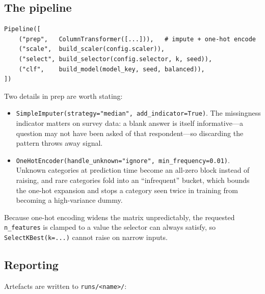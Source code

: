 \documentclass[11pt,a4paper]{article}
\begin{document}
\subsection{The pipeline}

\begin{lstlisting}
Pipeline([
    ("prep",   ColumnTransformer([...])),   # impute + one-hot encode
    ("scale",  build_scaler(config.scaler)),
    ("select", build_selector(config.selector, k, seed)),
    ("clf",    build_model(model_key, seed, balanced)),
])
\end{lstlisting}


Two details in \textsf{prep} are worth stating:

\begin{itemize}[leftmargin=1.4em,itemsep=0.3em]
  \item \texttt{SimpleImputer(strategy="median", add\_indicator=True)}. The
  missingness indicator matters on survey data: a blank answer is itself
  informative---a question may not have been asked of that respondent---so
  discarding the pattern throws away signal.
  \item \texttt{OneHotEncoder(handle\_unknown="ignore", min\_frequency=0.01)}.
  Unknown categories at prediction time become an all-zero block instead of
  raising, and rare categories fold into an ``infrequent'' bucket, which bounds
  the one-hot expansion and stops a category seen twice in training from
  becoming a high-variance dummy.
\end{itemize}

Because one-hot encoding widens the matrix unpredictably, the requested
\texttt{n\_features} is clamped to a value the selector can always satisfy, so
\texttt{SelectKBest(k=...)} cannot raise on narrow inputs.

\subsection{Reporting}

Artefacts are written to \texttt{runs/<name>/}:
\end{document}
